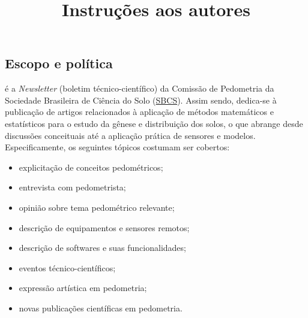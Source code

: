 \title{Instruções aos autores}
\maketitle
\newcommand{\SBCS}{\href{http://www.sbcs.org.br/}{SBCS}}
\newcommand{\Nature}{\href{http://www.nature.com/nature/authors/gta/}{Nature}}
\newcommand{\Science}{\href{http://www.sciencemag.org/about/authors}{Science}}
\newcommand{\CreativeCommons}{\href{http://creativecommons.org/licenses/by-sa/2.0/}{CC-BY-SA}}
\newcommand{\Kile}{\href{http://kile.sourceforge.net/}{Kile}}
\newcommand{\MiKTeX}{\href{http://miktex.org/}{MiKTeX}}
\newcommand{\aquiLaTeX}{\href{https://docs.google.com/document/d/1F3IXzWNCeUrwKeFxA4iHS3aw1nforK1IqB126xbawvA/edit?usp=sharing}{aqui}}
\newcommand{\aquiWord}{\href{https://docs.google.com/document/d/1pyK03RBDPhOMrTVfvj9NcEfjGWeswqYbYDqEKq83drQ/edit?usp=sharing}{aqui}}
\newcommand{\Geoderma}{\href{http://www.elsevier.com/author-schemas/latex-instructions}{Geoderma}}
\newcommand{\EJSS}{\href{http://onlinelibrary.wiley.com/journal/10.1111/\%28ISSN\%291365-2389/homepage/ForAuthors.html}{European Journal of Soil Science}}

\subsection{Escopo e política}

\pedometria{} é a \textit{Newsletter} (boletim técnico-científico) da Comissão de Pedometria da Sociedade Brasileira de Ciência do Solo (\SBCS). Assim sendo, dedica-se à publicação de artigos relacionados à aplicação de métodos matemáticos e estatísticos para o estudo da gênese e distribuição dos solos, o que abrange desde discussões conceituais até a aplicação prática de sensores e modelos. Especificamente, os seguintes tópicos costumam ser cobertos:

\begin{itemize}
 \item explicitação de conceitos pedométricos;
 \item entrevista com pedometrista;
 \item opinião sobre tema pedométrico relevante;
 \item descrição de equipamentos e sensores remotos;
 \item descrição de softwares e suas funcionalidades;
 \item eventos técnico-científicos;
 \item expressão artística em pedometria;
 \item novas publicações científicas em pedometria.
\end{itemize}

